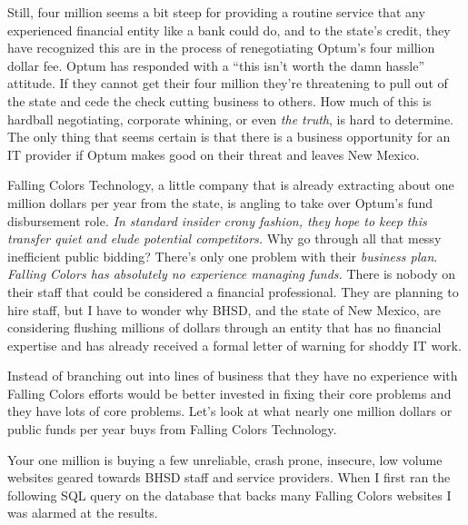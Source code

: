 Still, four million seems a bit steep for providing a routine service
that any experienced financial entity like a bank could do, and to the
state's credit, they have recognized this are in the process of
renegotiating Optum's four million dollar fee. Optum has responded with
a ``this isn't worth the damn hassle'' attitude. If they cannot get
their four million they're threatening to pull out of the state and cede
the check cutting business to others. How much of this is hardball
negotiating, corporate whining, or even \emph{the truth}, is hard to
determine. The only thing that seems certain is that there is a business
opportunity for an IT provider if Optum makes good on their threat and
leaves New Mexico.

Falling Colors Technology, a little company that is already extracting
about one million dollars per year from the state, is angling to take
over Optum's fund disbursement role. \emph{In standard insider crony
fashion, they hope to keep this transfer quiet and elude potential
competitors.} Why go through all that messy inefficient public bidding?
There's only one problem with their \emph{business plan}. \emph{Falling
Colors has absolutely no experience managing funds.} There is nobody on
their staff that could be considered a financial professional. They are
planning to hire staff, but I have to wonder why BHSD, and the state of
New Mexico, are considering flushing millions of dollars through an
entity that has no financial expertise and has already received a formal
letter of warning for shoddy IT work.

Instead of branching out into lines of business that they have no
experience with Falling Colors efforts would be better invested in
fixing their core problems and they have lots of core problems. Let's
look at what nearly one million dollars or public funds per year buys
from Falling Colors Technology.

Your one million is buying a few unreliable, crash prone, insecure, low
volume websites geared towards BHSD staff and service providers. When I
first ran the following SQL query on the database that backs many
Falling Colors websites I was alarmed at the results.

